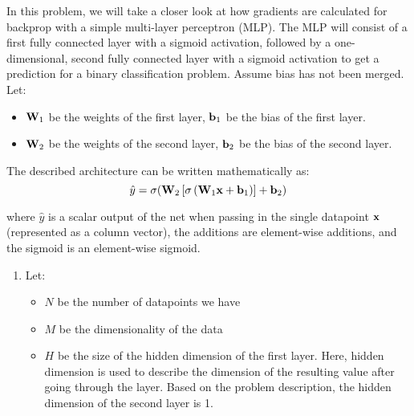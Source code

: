 \documentclass[submit]{harvardml}
\begin{document}
\newpage

\begin{problem}

  In this problem, we will take a closer look at how gradients are calculated for backprop with a simple multi-layer perceptron (MLP). The MLP will consist of a first fully connected layer with a sigmoid activation, followed by a one-dimensional, second fully connected layer with a sigmoid activation to get a prediction for a binary classification problem. Assume bias has not been merged. Let:
  \begin{itemize}
      \item $\bold{W}_1$ be the weights of the first layer, $\bold{b}_1$ be the bias of the first layer.
      \item $\bold{W}_2$ be the weights of the second layer, $\bold{b}_2$ be the bias of the second layer.
  \end{itemize}
  
  The described architecture can be written mathematically as: $$\hat{y} = \sigma(\bold{W}_2 \left[\sigma \left(\bold{W}_1 \bold{x} + \bold{b}_1\right)\right] + \bold{b}_2)$$
  
  where $\hat{y}$ is a scalar output of the net when passing in the single datapoint $\bold{x}$ (represented as a column vector), the additions are element-wise additions, and the sigmoid is an element-wise sigmoid.
  
  \begin{enumerate}
      \item Let:
      \begin{itemize}
          \item $N$ be the number of datapoints we have
          \item $M$ be the dimensionality of the data
          \item $H$ be the size of the hidden dimension of the first layer. Here, hidden dimension is used to describe the dimension of the resulting value after going through the layer. Based on the problem description, the hidden dimension of the second layer is 1.
      \end{itemize}
      

\end{enumerate}
\end{problem}
\end{document}
